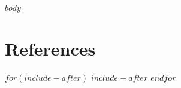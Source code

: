 \documentclass[12pt,letterpaper]{article}
\begin{document}
\newpage



$body$



\section*{References}\label{references}
\begingroup
\singlespacing\setlength{\parskip}{1em}
\renewcommand{\section}[2]{}


\endgroup



$for(include-after)$
$include-after$
$endfor$
\end{document}
